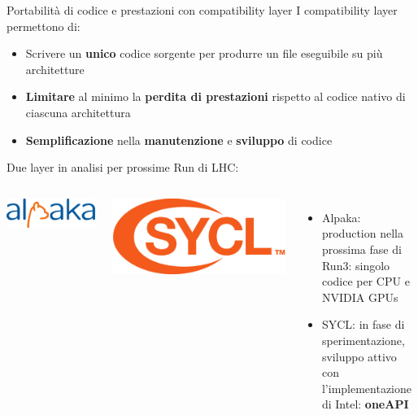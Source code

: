 \documentclass{beamer}
\begin{document}
\begin{frame}{Portabilità di codice e prestazioni con compatibility layer}
I compatibility layer permettono di:
\begin{itemize}
    \item Scrivere un \textbf{unico} codice sorgente per produrre un file eseguibile su più architetture
    \item \textbf{Limitare} al minimo la \textbf{perdita di prestazioni} rispetto al codice nativo di ciascuna architettura
    \item \textbf{Semplificazione} nella \textbf{manutenzione} e \textbf{sviluppo} di codice
\end{itemize}

Due layer in analisi per prossime Run di LHC:
\vspace{3mm}
\begin{columns}

\vspace{3mm}

\includegraphics[width=\textwidth]{media/alpaka.png}

\vspace{3mm}

\includegraphics[width=\textwidth]{media/sycl.png}
\begin{itemize}
    \item Alpaka: production nella prossima fase di Run3: singolo codice per CPU e NVIDIA GPUs
    \item SYCL: in fase di sperimentazione, sviluppo attivo con l'implementazione di Intel: \textbf{oneAPI}
\end{itemize}
\end{columns}

\end{frame}
\end{document}
